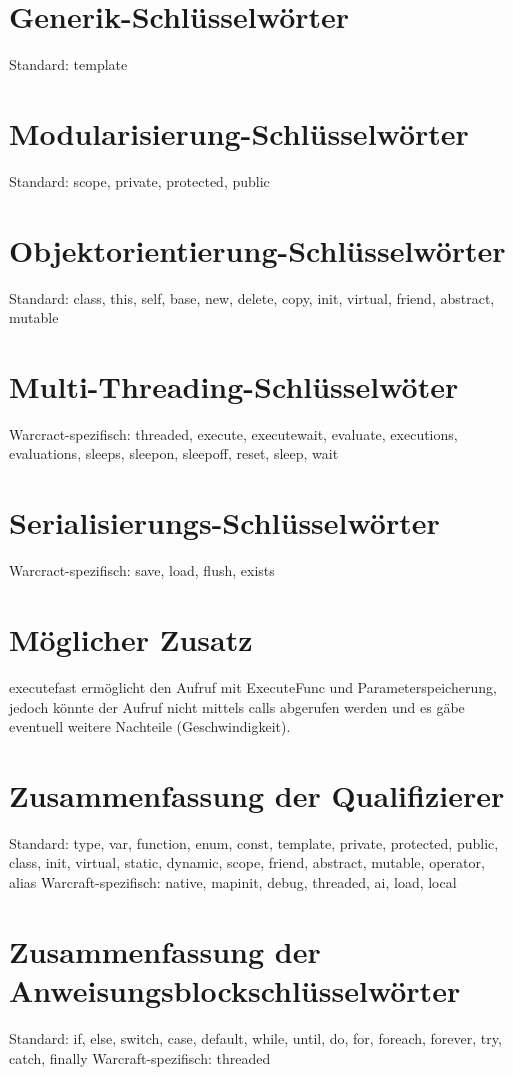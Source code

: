 \section{Generik-Schlüsselwörter}
Standard: template

\section{Modularisierung-Schlüsselwörter}
Standard: scope, private, protected, public

\section{Objektorientierung-Schlüsselwörter}
Standard: class, this, self, base, new, delete, copy, init, virtual, friend, abstract, mutable

\section{Multi-Threading-Schlüsselwöter}
Warcract-spezifisch: threaded, execute, executewait, evaluate, executions, evaluations, sleeps, sleepon, sleepoff, reset, sleep, wait

\section{Serialisierungs-Schlüsselwörter}
Warcract-spezifisch: save, load, flush, exists

\section{Möglicher Zusatz}
executefast ermöglicht den Aufruf mit ExecuteFunc und Parameterspeicherung, jedoch könnte
der Aufruf nicht mittels calls abgerufen werden und es gäbe eventuell weitere Nachteile
(Geschwindigkeit).

\section{Zusammenfassung der Qualifizierer}
Standard: type, var, function, enum, const, template, private, protected, public, class, init, virtual, static, dynamic, scope, friend, abstract, mutable, operator, alias
Warcraft-spezifisch: native, mapinit, debug, threaded, ai, load, local

\section{Zusammenfassung der Anweisungsblockschlüsselwörter}
Standard: if, else, switch, case, default, while, until, do, for, foreach, forever, try, catch, finally
Warcraft-spezifisch: threaded

